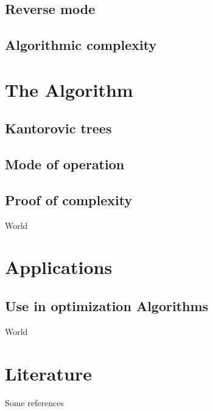 \documentclass[compress]{beamer}
\begin{document}
\subsection{Reverse mode}
\subsection{Algorithmic complexity}

\section{The Algorithm}
\subsection{Kantorovic trees}
\subsection{Mode of operation}
\subsection{Proof of complexity}

\begin{frame}
	World
\end{frame}

\section{Applications}
\subsection{Use in optimization Algorithms}

\begin{frame}
	World
\end{frame}

\section{Literature}
\begin{frame}
	Some references
\end{frame}
\end{document}
